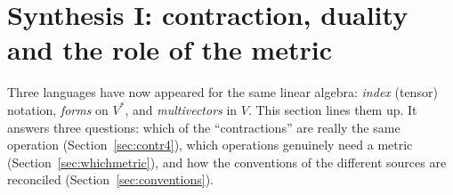 \section{Synthesis I: contraction, duality and the role of the metric}\label{sec:synth1}

\begin{synthesis}
Three languages have now appeared for the same linear algebra: \emph{index} (tensor) notation, \emph{forms} on $V^*$, and \emph{multivectors} in $V$. This
section lines them up. It answers three questions: which of the ``contractions'' are really the same operation
(Section~\ref{sec:contr4}), which operations genuinely need a metric (Section~\ref{sec:whichmetric}), and how the
conventions of the different sources are reconciled (Section~\ref{sec:conventions}).
\end{synthesis}




